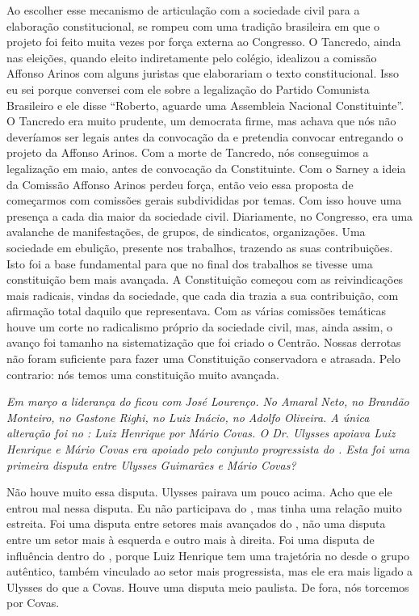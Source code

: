 Ao escolher esse mecanismo de articulação com a
sociedade civil para a elaboração constitucional, se rompeu com uma
tradição brasileira em que o projeto foi feito muita vezes por força
externa ao Congresso. O Tancredo, ainda nas eleições, quando eleito
indiretamente pelo colégio, idealizou a comissão Affonso Arinos com
alguns juristas que elaborariam o texto constitucional. Isso eu sei
porque conversei com ele sobre a legalização do Partido Comunista
Brasileiro e ele disse ``Roberto, aguarde uma Assembleia Nacional
Constituinte''. O Tancredo era muito prudente, um democrata firme, mas
achava que nós não deveríamos ser legais antes da convocação da  e
pretendia convocar entregando o projeto da Affonso Arinos. Com a morte
de Tancredo, nós conseguimos a legalização em maio, antes de convocação
da Constituinte. Com o Sarney a ideia da Comissão Affonso Arinos perdeu
força, então veio essa proposta de começarmos com comissões gerais
subdivididas por temas. Com isso houve uma presença a cada dia maior da
sociedade civil. Diariamente, no Congresso, era uma avalanche de
manifestações, de grupos, de sindicatos, organizações. Uma sociedade em
ebulição, presente nos trabalhos, trazendo as suas contribuições. Isto
foi a base fundamental para que no final dos trabalhos se tivesse uma
constituição bem mais avançada. A Constituição começou com as
reivindicações mais radicais, vindas da sociedade, que cada dia trazia a
sua contribuição, com afirmação total daquilo que representava. Com as
várias comissões temáticas houve um corte no radicalismo próprio da
sociedade civil, mas, ainda assim, o avanço foi tamanho na
sistematização que foi criado o Centrão. Nossas derrotas não foram
suficiente para fazer uma Constituição conservadora e atrasada. Pelo
contrario: nós temos uma constituição muito avançada.

\medskip

\emph{Em março a liderança do  ficou com José Lourenço. No 
Amaral Neto, no  Brandão Monteiro, no  Gastone Righi, no  Luiz
Inácio, no  Adolfo Oliveira. A única alteração foi no : Luiz
Henrique por Mário Covas. O Dr. Ulysses apoiava Luiz Henrique e Mário
Covas era apoiado pelo conjunto progressista do . Esta foi uma
primeira disputa entre Ulysses Guimarães e Mário Covas?}

Não houve muito essa disputa. Ulysses pairava um pouco
acima. Acho que ele entrou mal nessa disputa. Eu não participava do
, mas tinha uma relação muito estreita. Foi uma disputa entre
setores mais avançados do , não uma disputa entre um setor mais à
esquerda e outro mais à direita. Foi uma disputa de influência dentro do
, porque Luiz Henrique tem uma trajetória no  desde o grupo
autêntico, também vinculado ao setor mais progressista, mas ele era mais
ligado a Ulysses do que a Covas. Houve uma disputa meio paulista. De
fora, nós torcemos por Covas.


